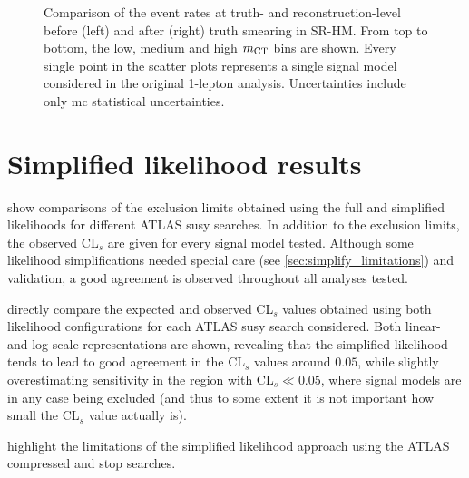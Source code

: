 \begin{figure}
\begin{subfigure}[b]{0.49\linewidth}
	\end{subfigure}
	\caption{Comparison of the event rates at truth- and reconstruction-level before (left) and after (right) truth smearing in SR-HM. From top to bottom, the low, medium and high $m_{\textrm{CT}}$ bins are shown. Every single point in the scatter plots represents a single signal model considered in the original 1-lepton analysis. Uncertainties include only \gls{mc} statistical uncertainties.}
	\label{fig:smearing_signal_regions_3}
\end{figure}


\FloatBarrier

\ifpdf
\graphicspath{{chapter-simplify/Figs/Raster/}{chapter-simplify/Figs/PDF/}{chapter-simplify/Figs/}}
\else
\graphicspath{{chapter-simplify/Figs/Vector/}{chapter-simplify/Figs/}}
\fi

\section{Simplified likelihood results}

 show comparisons of the exclusion limits obtained using the full and simplified likelihoods for different ATLAS \gls{susy} searches. In addition to the exclusion limits, the observed CL$_s$ are given for every signal model tested. 
Although some likelihood simplifications needed special care (see \cref{sec:simplify_limitations}) and validation, a good agreement is observed throughout all analyses tested.

 directly compare the expected and observed CL$_s$ values obtained using both likelihood configurations for each ATLAS \gls{susy} search considered. Both linear- and log-scale representations are shown, revealing that the simplified likelihood tends to lead to good agreement in the CL$_s$ values around $0.05$, while slightly overestimating sensitivity in the region with CL$_s \ll 0.05$, where signal models are in any case being excluded (and thus to some extent it is not important how small the CL$_s$ value actually is).

 highlight the limitations of the simplified likelihood approach using the ATLAS compressed and stop searches.

\vspace{5em}

